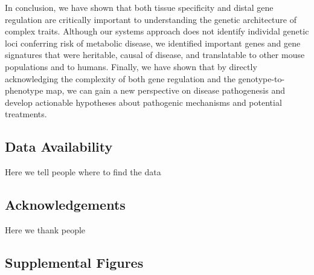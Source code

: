 \documentclass[
]{article}
\begin{document}
In conclusion, we have shown that both tissue specificity and distal
gene regulation are critically important to understanding the genetic
architecture of complex traits. Although our systems approach does not
identify individal genetic loci conferring risk of metabolic disease, we
identified important genes and gene signatures that were heritable,
causal of disease, and translatable to other mouse populations and to
humans. Finally, we have shown that by directly acknowledging the
complexity of both gene regulation and the genotype-to-phenotype map, we
can gain a new perspective on disease pathogenesis and develop
actionable hypotheses about pathogenic mechanisms and potential
treatments.

\subsection{Data Availability}\label{data-availability}

Here we tell people where to find the data

\subsection{Acknowledgements}\label{acknowledgements}

Here we thank people

\pagebreak

\subsection{Supplemental Figures}\label{supplemental-figures}
\end{document}
